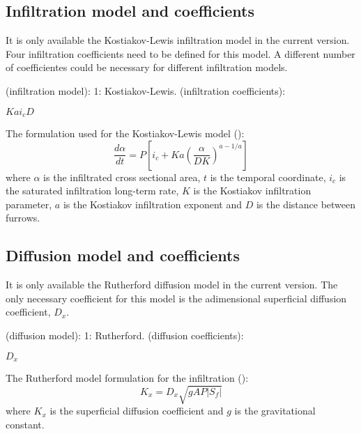\documentclass[a4paper,12pt]{report}
\begin{document}
\subsection{Infiltration model and coefficients}
It is only available the Kostiakov-Lewis infiltration model in the current version. Four infiltration coefficients need to be defined for this model.
A different number of coefficientes could be necessary for different infiltration models.  
\begin{verbatimtab}[4]
(infiltration model): 
		1: Kostiakov-Lewis.
(infiltration coefficients):
\end{verbatimtab}
\vspace{-0.5cm}
\hspace{1.8cm}$K$\hspace{0.9cm}$a$\hspace{0.9cm}$i_c$\hspace{0.9cm}$D$

The formulation used for the Kostiakov-Lewis model (\cite{JaviSurcos1}):
\begin{equation}
\frac{d\alpha}{dt}=P\left[ i_c + Ka \left( \frac{\alpha}{DK} \right)^{a-1/a} \right]
\end{equation}
\noindent where $\alpha$ is the infiltrated cross sectional area, $t$ is the temporal coordinate, $i_c$ is the saturated infiltration long-term rate, $K$ is the Kostiakov infiltration parameter, $a$ is the Kostiakov infiltration exponent and $D$ is the distance between furrows.

\subsection{Diffusion model and coefficients}
It is only available the Rutherford diffusion model in the current version. The only necessary coefficient for this model is 
the adimensional superficial diffusion coefficient, $D_x$.
\begin{verbatimtab}[4]
(diffusion model): 
		1: Rutherford.
(diffusion coefficients):
\end{verbatimtab}
\vspace{-0.5cm}
\hspace{1.8cm}$D_x$ 

The Rutherford model formulation for the infiltration (\cite{JaviSurcos1}):
\begin{equation}
K_x=D_x\sqrt{gAP|S_f|}
\end{equation}
\noindent where $K_x$ is the superficial diffusion coefficient and $g$ is the gravitational constant.
\end{document}
